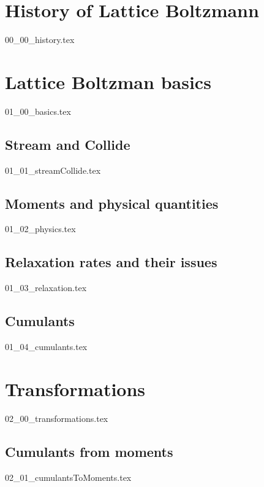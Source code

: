 \documentclass[12pt,a4paper,twoside]{article}
\begin{document}
\newpage
\tableofcontents
\newpage
\printglossaries{}
\newpage

\pagestyle{headings}
\section{History of Lattice Boltzmann}
\label{sec: History of Lattice Boltzmann}
{00_00_history.tex}

\section{Lattice Boltzman basics}
\label{sec: Lattice Boltzman basics}
{01_00_basics.tex}

\subsection{Stream and Collide}
\label{sub: Stream and Collide}
{01_01_streamCollide.tex}

\subsection{Moments and physical quantities}
\label{sub: Moments and physical quantities}
{01_02_physics.tex}

\subsection{Relaxation rates and their issues}
\label{sub: Relaxation rates and their issues}
{01_03_relaxation.tex}

\subsection{Cumulants}
\label{sub: Cumulants}
{01_04_cumulants.tex}

\section{Transformations}
\label{sec: Transformations}
{02_00_transformations.tex}

\subsection{Cumulants from moments}
\label{sub: Cumulants from moments}
{02_01_cumulantsToMoments.tex}
\end{document}
